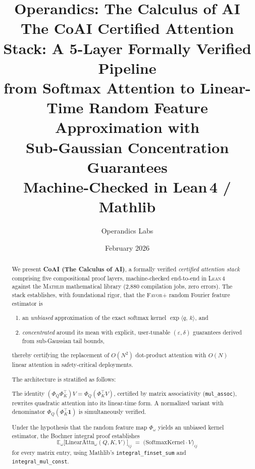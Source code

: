 \documentclass[11pt,a4paper]{article}
\title{%
  \textbf{Operandics: The Calculus of AI} \\[4pt]
  \large The CoAI Certified Attention Stack: A 5-Layer Formally Verified Pipeline \\
  from Softmax Attention to Linear-Time Random Feature Approximation with \\
  Sub-Gaussian Concentration Guarantees \\[8pt]
  \normalsize Machine-Checked in Lean\,4 / Mathlib
}
\author{%
  Operandics Labs
}
\date{February 2026}
\newcommand{\E}{\mathbb{E}}
\newcommand{\favor}{\textsc{Favor+}}
\newcommand{\lean}{\textsc{Lean\,4}}
\newcommand{\mathlib}{\textsc{Mathlib}}
\newcommand{\ip}[2]{\langle #1,\, #2 \rangle}
\begin{document}
\maketitle
\thispagestyle{empty}

\begin{abstract}

We present \textbf{CoAI (The Calculus of AI)}, a formally verified \emph{certified attention stack}
comprising five compositional proof layers, machine-checked end-to-end in
\lean{} against the \mathlib{} mathematical library (2,880 compilation jobs,
zero errors).  The stack establishes, with foundational rigor, that the
\favor{} random Fourier feature estimator is
\begin{enumerate}[label=(\roman*),nosep]
  \item an \emph{unbiased} approximation of the exact softmax kernel
        $\exp\!\ip{q}{k}$, and
  \item \emph{concentrated} around its mean with explicit, user-tunable
        $(\varepsilon,\delta)$ guarantees derived from sub-Gaussian tail
        bounds,
\end{enumerate}
thereby certifying the replacement of $O(N^2)$ dot-product attention with
$O(N)$ linear attention in safety-critical deployments.

\medskip\noindent
The architecture is stratified as follows:

\begin{description}[style=nextline, leftmargin=2em, font=\normalfont\itshape]
  \item[Layer 0 — Algebraic Factorization.]
    The identity $(\Phi_Q \Phi_K^\top) V = \Phi_Q (\Phi_K^\top V)$, certified
    by matrix associativity (\texttt{mul\_assoc}), rewrites quadratic attention
    into its linear-time form.  A normalized variant with denominator
    $\Phi_Q (\Phi_K^\top \mathbf{1})$ is simultaneously verified.

  \item[Layer 1 — Structural Bridge (Bochner Integral).]
    Under the hypothesis that the random feature map $\Phi_\omega$ yields an
    unbiased kernel estimator, the Bochner integral proof establishes
    \[
      \E_\omega\!\bigl[\text{LinearAttn}_\omega(Q,K,V)\bigr]_{ij}
      \;=\;
      \bigl(\text{SoftmaxKernel} \cdot V\bigr)_{ij}
    \]
    for every matrix entry, using Mathlib's \texttt{integral\_finset\_sum}
    and \texttt{integral\_mul\_const}.


\end{description}
\end{abstract}
\end{document}
